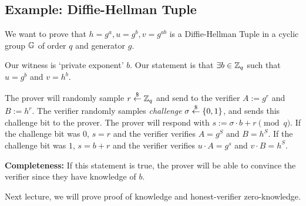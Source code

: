 \subsection{Example: Diffie-Hellman Tuple}

We want to prove that $h = g^a, u = g^b, v = g^{ab}$ is a Diffie-Hellman Tuple in a cyclic group $\mathbb G$ of order $q$ and generator $g$.

Our witness is `private exponent' $b$. Our statement is that $\exists b\in \mathbb Z_q$ such that $u = g^b$ and $v = h^b$.


The prover will randomly sample $r\overset{\$}{\leftarrow} \mathbb Z_q$ and send to the verifier $A:=g^r$ and $B:=h^r$. The verifier randomly samples \emph{challenge} $\sigma \overset{\$}{\leftarrow} \{0, 1\}$, and sends this challenge bit to the prover. The prover will respond with $s := \sigma\cdot b + r\pmod{q}$. If the challenge bit was $0$, $s = r$ and the verifier verifies $A = g^S$ and $B = h^S$. If the challenge bit was $1$, $s = b + r$ and the verifier verifies $u\cdot A = g^s$ and $v\cdot B = h^S$.

\textbf{Completeness:} If this statement is true, the prover will be able to convince the verifier since they have knowledge of $b$.

Next lecture, we will prove proof of knowledge and honest-verifier zero-knowledge.